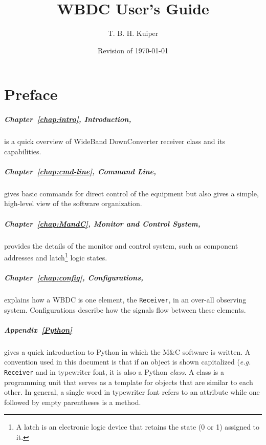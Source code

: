 \documentclass[letterpaper,11pt]{book}
\title{WBDC User's Guide}
\author{T. B. H. Kuiper}
\date{Revision of \today}
\begin{document}
\maketitle
\frontmatter
\chapter*{Preface}

\paragraph{Chapter~\ref{chap:intro}, Introduction,} is a quick overview of 
WideBand DownConverter receiver class and its capabilities.

\paragraph{Chapter~\ref{chap:cmd-line}, Command Line,} gives basic commands 
for direct 
control of the  equipment but also gives a simple, high-level view of the 
software organization.  

\paragraph{Chapter~\ref{chap:MandC}, Monitor and Control System,} provides the
details of the monitor and control system, such as component addresses and 
latch\footnote{A latch is an electronic logic device that retains the state
(0 or 1) assigned to it.} logic states.

\paragraph{Chapter~\ref{chap:config}, Configurations,} explains how a WBDC is 
one element,
the {\tt Receiver}, in an over-all observing system.  Configurations describe 
how the signals flow between these elements.

\paragraph{Appendix~\ref{Python}} gives a quick introduction to Python in 
which the M\&C software is written. A convention used in this document is that 
if an object 
is shown capitalized ({\it e.g.} {\tt Receiver} and in typewriter font, it is
also a Python {\it class}. A class is a programming unit that serves as a 
template for objects that are similar to each other.  In general,
a single word in typewriter font refers to an attribute while one followed by
empty parentheses is a method.
\end{document}
